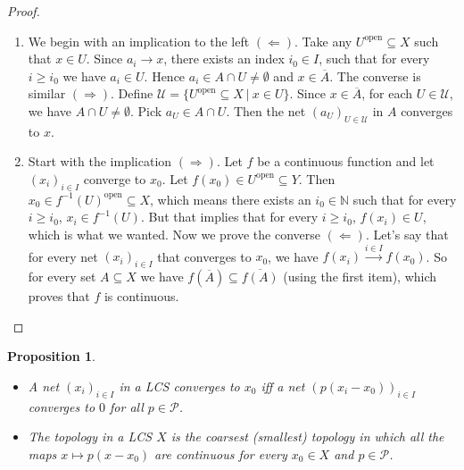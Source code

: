 \documentclass[10pt, a4paper]{article}
\newtheorem{proposition}[thm]{Proposition}
\newenvironment{noticeC}{%
  \tcolorbox[%
  notitle,
  empty,
  enhanced,  %
  breakable,
  coltext=black, 
  fontupper=\rmfamily,
  noparskip,
  sharp corners,
  boxrule=-1pt,  %
  frame hidden,
  left=7pt,  %
  right=7pt,
  top=5pt,
  bottom=5pt,
  before skip=2.5ex plus 2pt,
  after skip=2.5ex plus 2pt,
  overlay unbroken and last={%
  },
  ]}
{\endtcolorbox}
\newenvironment{myproof}%
  {\begin{noticeC}\begin{proof}}%
  {\end{proof}\end{noticeC}}
\newcommand{\N}{\mathbb {N}}
\begin{document}
\begin{myproof}
  \begin{enumerate}
    \item We begin with an implication to the left $(\Leftarrow)$.
    Take any $U^{\textrm{open}} \subseteq X$ such that $x \in U$. Since $a_i \to x$, there exists an index $i_0 \in I$,
    such that for every $i \geq i_0$ we have $a_i \in U$. Hence $a_i \in A \cap U \neq \emptyset$ and $x \in \overline{A}$.
    The converse is similar $(\Rightarrow)$. Define $\mathcal{U} = \{U^{\textrm{open}} \subseteq X\ |\ x \in U\}$.
    Since $x \in \overline{A}$, for each $U \in \mathcal{U}$, we have $A \cap U \neq \emptyset$.
    Pick $a_U \in A \cap U$. Then the net $(a_U)_{U \in \mathcal{U}}$ in $A$ converges to $x$.
    \item Start with the implication $(\Rightarrow)$. Let $f$ be a continuous function and let $(x_i)_{i \in I}$ converge to $x_0$.
    Let $f(x_0) \in U^{\textrm{open}} \subseteq Y$. Then $x_0 \in f^{-1} (U) ^{\textrm{open}} \subseteq X$, which means there exists an $i_0 \in \N$ 
    such that for every $i \geq i_0$, $x_i \in f^{-1} (U)$. But that implies that for every $i \geq i_0$, $f(x_i) \in U$, which is what we wanted.
    Now we prove the converse $(\Leftarrow)$. Let's say that for every net $(x_i)_{i \in I}$ that converges to $x_0$, we have $f(x_i) \xrightarrow{i \in I} f(x_0)$.
    So for every set $A \subseteq X$ we have $f(\overline{A}) \subseteq \overline{f(A)}$ (using the first item),
    which proves that $f$ is continuous. \qedhere
  \end{enumerate}
\end{myproof}

\begin{proposition}
    \begin{itemize}
        \item[(a)] A net $(x_i)_{i \in I}$ in a LCS converges to $x_0$ iff a net $(p(x_i - x_0))_{i \in I}$ converges to $0$ for all $p \in \mathcal{P}$.
        \item[(b)] The topology in a LCS $X$ is the coarsest (smallest) topology in which all the maps 
        $x \mapsto p(x - x_0)$ are continuous for every $x_0 \in X$ and $p \in \mathcal{P}$.
    \end{itemize}
\end{proposition}
\end{document}
